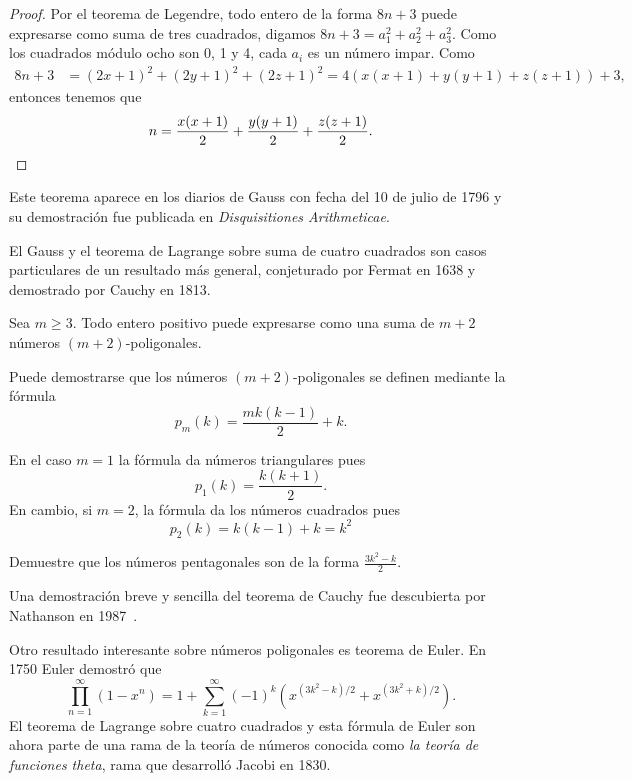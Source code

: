 \begin{proof}
	Por el teorema de Legendre, todo entero de la forma $8n+3$ puede expresarse
	como suma de tres cuadrados, digamos $8n+3=a_1^2+a_2^2+a_3^2$. Como los
	cuadrados módulo ocho son 0, 1 y 4, cada $a_i$ es un número impar. Como 
	\begin{align*}
		8n+3&=(2x+1)^2+(2y+1)^2+(2z+1)^2
		=4(x(x+1)+y(y+1)+z(z+1))+3,
	\end{align*}
	entonces tenemos que 
	\[
		n=\frac{x(x+1)}{2}+\frac{y(y+1)}{2}+\frac{z(z+1)}{2}.\qedhere
	\]
\end{proof}

Este teorema aparece en los diarios de Gauss con fecha del 10 de julio de 1796
y su demostración fue publicada en \emph{Disquisitiones Arithmeticae}.  

El Gauss y el teorema de Lagrange sobre suma de cuatro cuadrados son
casos particulares de un resultado más general, conjeturado por Fermat en 1638
y demostrado por Cauchy en 1813. 

\begin{theorem}[Cauchy]
\label{thm:Cauchy}
    Sea $m\geq3$. Todo entero positivo puede
    expresarse como una suma de $m+2$ números $(m+2)$-poligonales.
\end{theorem}

Puede demostrarse que los números
$(m+2)$-poligonales se definen mediante la fórmula
\[
	p_m(k)=\frac{mk(k-1)}{2}+k.
\]

En el caso $m=1$ la fórmula da números triangulares pues
\[
	p_1(k)=\frac{k(k+1)}{2}.
\]
En cambio, si 
$m=2$, la fórmula da los números cuadrados pues
\[
p_2(k)=k(k-1)+k=k^2
\]

\begin{exercise}
	Demuestre que los números pentagonales son de la forma
	$\displaystyle{\frac{3k^2-k}{2}}$. 
\end{exercise}

Una demostración
breve y sencilla del teorema de Cauchy fue descubierta por Nathanson en
1987~\cite{MR866422}.

Otro resultado interesante sobre números poligonales es teorema de Euler. 
En 1750 Euler demostró que
\[
	\prod_{n=1}^\infty(1-x^n)=1+\sum_{k=1}^\infty (-1)^k\left(x^{(3k^2-k)/2}+x^{(3k^2+k)/2}\right).
\]
El teorema de Lagrange sobre cuatro cuadrados y esta fórmula de Euler son ahora
parte de una rama de la teoría de números conocida como
\emph{la teoría de funciones theta}, rama que desarrolló Jacobi en 1830. 

